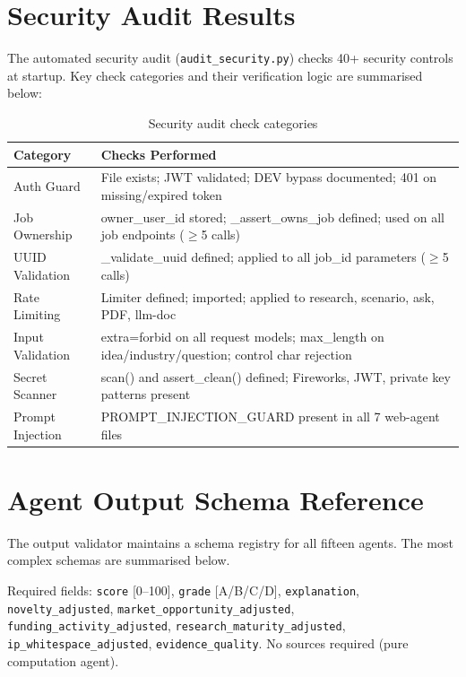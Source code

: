 \documentclass[12pt,a4paper,oneside]{book}
\begin{document}
\chapter{Security Audit Results}
\label{app:security_audit}

The automated security audit (\texttt{audit\_security.py}) checks 40+ security controls at startup. Key check categories and their verification logic are summarised below:

\begin{table}[H]
\centering
\caption{Security audit check categories}
\label{tab:security_audit}
\begin{tabularx}{\textwidth}{lX}
\toprule
\textbf{Category} & \textbf{Checks Performed} \\
\midrule
Auth Guard        & File exists; JWT validated; DEV bypass documented; 401 on missing/expired token \\
Job Ownership     & owner\_user\_id stored; \_assert\_owns\_job defined; used on all job endpoints ($\geq$5 calls) \\
UUID Validation   & \_validate\_uuid defined; applied to all job\_id parameters ($\geq$5 calls) \\
Rate Limiting     & Limiter defined; imported; applied to research, scenario, ask, PDF, llm-doc \\
Input Validation  & extra=forbid on all request models; max\_length on idea/industry/question; control char rejection \\
Secret Scanner    & scan() and assert\_clean() defined; Fireworks, JWT, private key patterns present \\
Prompt Injection  & PROMPT\_INJECTION\_GUARD present in all 7 web-agent files \\
\bottomrule
\end{tabularx}
\end{table}

\chapter{Agent Output Schema Reference}
\label{app:schemas}

The output validator maintains a schema registry for all fifteen agents. The most complex schemas are summarised below.

\begin{infobox}
Required fields: \texttt{score} [0–100], \texttt{grade} [A/B/C/D], \texttt{explanation},
\texttt{novelty\_adjusted}, \texttt{market\_opportunity\_adjusted}, \texttt{funding\_activity\_adjusted},
\texttt{research\_maturity\_adjusted}, \texttt{ip\_whitespace\_adjusted}, \texttt{evidence\_quality}.
No sources required (pure computation agent).
\end{infobox}
\end{document}
